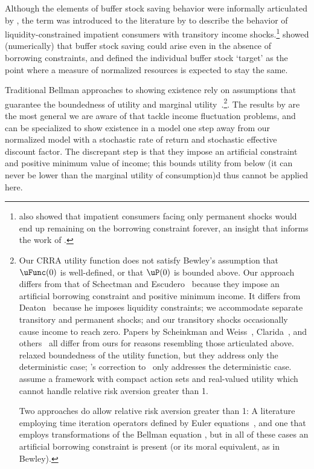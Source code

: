 \documentclass[BufferStockTheory]{subfiles}
\begin{document}
Although the elements of buffer stock saving behavior were informally articulated by \cite{friedmanATheory}, the term was introduced to the literature by \cite{deatonLiqConstr} to describe the behavior of liquidity-constrained impatient consumers with transitory income shocks.\footnote{\cite{deatonLiqConstr} also showed that impatient consumers facing only permanent shocks would end up remaining on the borrowing constraint forever, an insight that informs the work of \cite{kvwWealthyH2m}.} \cite{carroll:brookings} showed (numerically) that buffer stock saving could arise even in the absence of borrowing constraints, and defined the individual buffer stock `target' as the point where a measure of normalized resources is expected to stay the same.


Traditional Bellman approaches to showing existence rely on assumptions that guarantee the boundedness of utility and marginal utility~\citep{slpMethods}.\footnote{Our CRRA utility function does not satisfy Bewley's assumption that $\uFunc(0)$ is well-defined, or that $\uP(0)$ is bounded above. %
  Our approach differs from that of Schectman and Escudero~\citeyearpar{seIncFluct} because they impose an artificial borrowing constraint and positive minimum income.
  It differs from Deaton~\citeyearpar{deatonLiqConstr} because he imposes liquidity constraints; we accommodate separate transitory and permanent shocks; and our transitory shocks occasionally cause income to reach zero.
  Papers by Scheinkman and Weiss~\citeyearpar{scheinkman&weiss:borrowing}, Clarida~\citep{claridaErgodic}, and others~\cite{cwcUnderUncert} all differ from ours for reasons resembling those articulated above.
  \cite{asHomogeneous} relaxed boundedness of the utility function, but they address only the deterministic case; \cite{mvExistence}'s correction to~\cite{rrExistence} only addresses the deterministic case.
  \cite{mnUnique} assume a framework with compact action sets and real-valued utility which cannot handle relative risk aversion greater than 1. %
  
  Two approaches do allow relative risk aversion greater than 1:  A literature employing time iteration operators defined by Euler equations~\citep{deatonLiqConstr, lsIncFluct, mstIncFluct}, and one that employs transformations of the Bellman equation \citep{rinconZapatero2024}, but in all of these cases an artificial borrowing constraint is present (or its moral equivalent, as in Bewley). %
}.
The results by \cite{mstIncFluct,maUnboundedDP} are the most general we are aware of that tackle income fluctuation problems, and can be specialized to show existence in a model one step away from our normalized model with a stochastic rate of return and stochastic effective discount factor. The discrepant step is that they impose an artificial constraint and positive minimum value of income; this bounds utility from below (it can never be lower than the marginal utility of consumption)d thus cannot be applied here.
\end{document}
